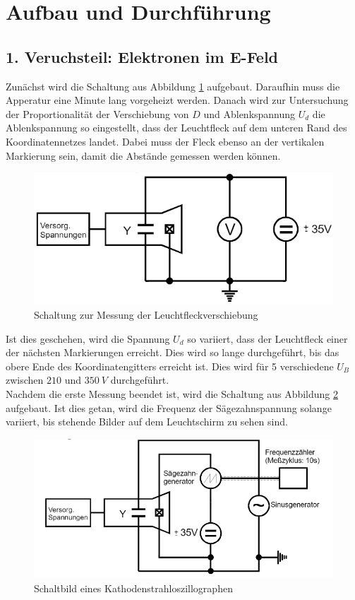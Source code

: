 \section{Aufbau und Durchführung}
\subsection{1. Veruchsteil: Elektronen im E-Feld}
  Zunächst wird die Schaltung aus Abbildung \ref{fig:Schaltung1} aufgebaut. Daraufhin muss die Apperatur
  eine Minute lang vorgeheizt werden.
  Danach wird zur Untersuchung der Proportionalität der Verschiebung von $D$ und Ablenkspannung $U_d$ die Ablenkspannung so eingestellt, dass
  der Leuchtfleck auf dem unteren Rand des Koordinatennetzes landet. Dabei muss der Fleck ebenso an der vertikalen Markierung sein, damit die
  Abstände gemessen werden können.
  \begin{figure}[H]
    \centering
    \includegraphics{Text/Bilder/Schaltung1}
    \caption{Schaltung zur Messung der Leuchtfleckverschiebung \cite[85]{sample2}}
    \label{fig:Schaltung1}
  \end{figure}
  Ist dies geschehen, wird die Spannung $U_d$ so variiert, dass der Leuchtfleck einer der nächsten Markierungen erreicht. Dies wird so
  lange durchgeführt, bis das obere Ende des Koordinatengitters erreicht ist.
  Dies wird für 5 verschiedene $U_B$ zwischen $210$ und $\SI{350}{V}$ durchgeführt.
\\
  Nachdem die erste Messung beendet ist, wird die Schaltung aus Abbildung \ref{fig:Schaltung2} aufgebaut.
  Ist dies getan, wird die Frequenz der Sägezahnspannung solange variiert, bis stehende Bilder auf dem Leuchtschirm zu sehen sind.
  \begin{figure}[H]
    \centering
    \includegraphics{Text/Bilder/Schaltung2}
    \caption{Schaltbild eines Kathodenstrahloszillographen \cite[85]{sample2}}
    \label{fig:Schaltung2}
  \end{figure}
